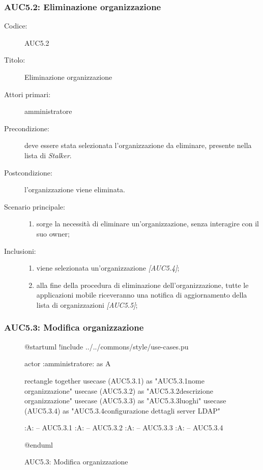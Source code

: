 \documentclass[../../../analisi-dei-requisiti.tex]{subfiles}
\begin{document}
\subsubsection{AUC5.2: Eliminazione organizzazione}%
\label{subs:AUC5.2}
\begin{description}
  \item[Codice:] AUC5.2
  \item[Titolo:] Eliminazione organizzazione
  \item[Attori primari:] amministratore
  \item[Precondizione:] deve essere stata selezionata l'organizzazione da eliminare, presente nella lista di \emph{Stalker}.
  \item[Postcondizione:] l'organizzazione viene eliminata.
  \item[Scenario principale:]
  \begin{enumerate}
    \item sorge la necessità di eliminare un'organizzazione, senza interagire con il suo owner;
  \end{enumerate}
  \item[Inclusioni:]
  \begin{enumerate}
    \item viene selezionata un'organizzazione \emph{[AUC5.4]};
    \item alla fine della procedura di eliminazione dell'organizzazione, tutte le applicazioni mobile riceveranno una notifica di aggiornamento della lista di organizzazioni \emph{[AUC5.5]};
  \end{enumerate}
\end{description}

\subsubsection{AUC5.3: Modifica organizzazione}%
\label{subs:AUC5.3}

\begin{figure}[H]
  \centering
  \begin{plantuml}
  @startuml
  !include ../../commons/style/use-cases.pu

  actor :amministratore: as A

  rectangle {
    together {
      usecase (AUC5.3.1) as "AUC5.3.1\nModifica nome organizzazione"
      usecase (AUC5.3.2) as "AUC5.3.2\nModifica descrizione organizzazione"
      usecase (AUC5.3.3) as "AUC5.3.3\nGestione luoghi"
      usecase (AUC5.3.4) as "AUC5.3.4\nModifica configurazione dettagli server LDAP"
    }
  }

  :A: -- AUC5.3.1
  :A: -- AUC5.3.2
  :A: -- AUC5.3.3
  :A: -- AUC5.3.4

  @enduml
  \end{plantuml}
  \caption{AUC5.3: Modifica organizzazione}
  \label{fig:AUC5_3}
\end{figure}
\end{document}
